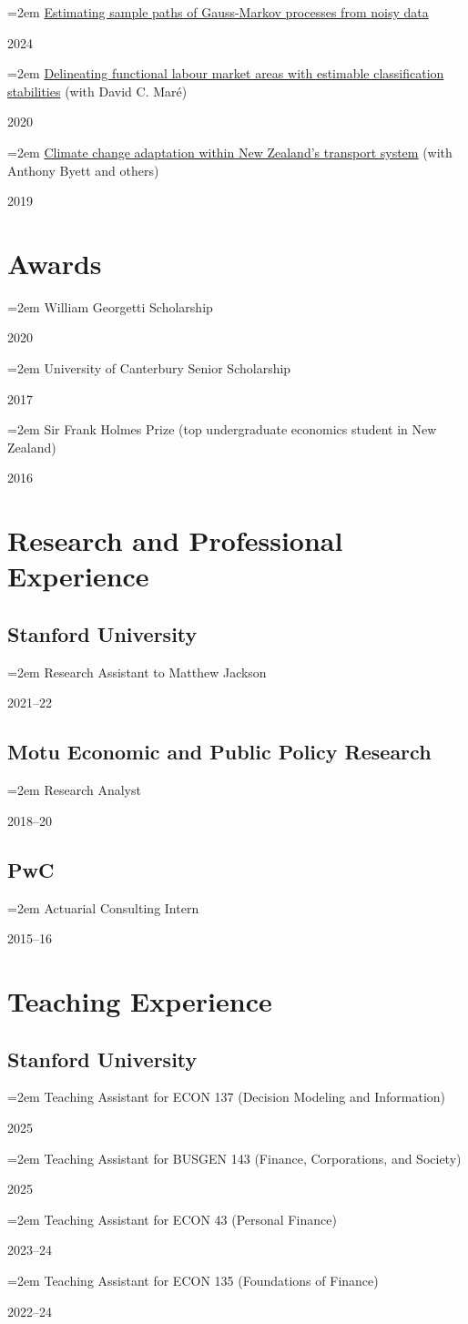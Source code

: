 \documentclass[11pt,oneside]{memoir}
\newcommand{\datedentry}[2]{\par\parbox[t]{0.9\linewidth}{\strut\raggedright\hangindent=2em #2\strut}\hfill#1}
\begin{document}
\datedentry{2024}{\href{https://arxiv.org/abs/2404.00784}{Estimating sample paths of Gauss-Markov processes from noisy data}}
\datedentry{2020}{\href{https://www.iza.org/publications/dp/13642}{Delineating functional labour market areas with estimable classification stabilities} (with David C. Maré)}
\datedentry{2019}{\href{https://motu.nz/assets/Documents/our-work/environment/climate-change-impacts/Transport-Dialogue-Report.pdf}{Climate change adaptation within New Zealand's transport system} (with Anthony Byett and others)}

\section{Awards}

\datedentry{2020}{William Georgetti Scholarship}
\datedentry{2017}{University of Canterbury Senior Scholarship}
\datedentry{2016}{Sir Frank Holmes Prize (top undergraduate economics student in New Zealand)}

\section{Research and Professional Experience}

\subsection{Stanford University}
\datedentry{2021--22}{Research Assistant to Matthew Jackson}

\subsection{Motu Economic and Public Policy Research}
\datedentry{2018--20}{Research Analyst}

\subsection{PwC}
\datedentry{2015--16}{Actuarial Consulting Intern}

\section{Teaching Experience}

\subsection{Stanford University}
\datedentry{2025}{Teaching Assistant for ECON 137 (Decision Modeling and Information)}
\datedentry{2025}{Teaching Assistant for BUSGEN 143 (Finance, Corporations, and Society)}
\datedentry{2023--24}{Teaching Assistant for ECON 43 (Personal Finance)}
\datedentry{2022--24}{Teaching Assistant for ECON 135 (Foundations of Finance)}
\end{document}

